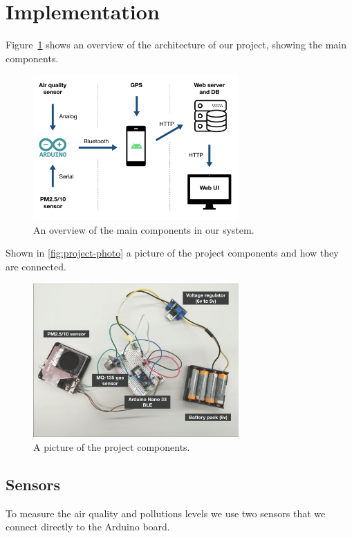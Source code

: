 \documentclass[12pt]{article}
\begin{document}
  \section{Implementation}

  Figure~\ref{fig:architecture} shows an overview of the architecture of our project, showing the main components.
  \begin{figure}[H]
    \centering
    \includegraphics[width=0.7\textwidth]{images/architecture.png}
    \caption{An overview of the main components in our system.}
    \label{fig:architecture}
  \end{figure}

  Shown in \autoref{fig:project-photo} a picture of the project components and how they are connected.
  \begin{figure}[H]
    \centering
    \includegraphics[width=0.7\textwidth]{images/project-all.png}
    \caption{A picture of the project components.}
    \label{fig:project-photo}
  \end{figure}
  
  \subsection{Sensors}
  To measure the air quality and pollutions levels we use two sensors that we connect directly to the Arduino board.
\end{document}
